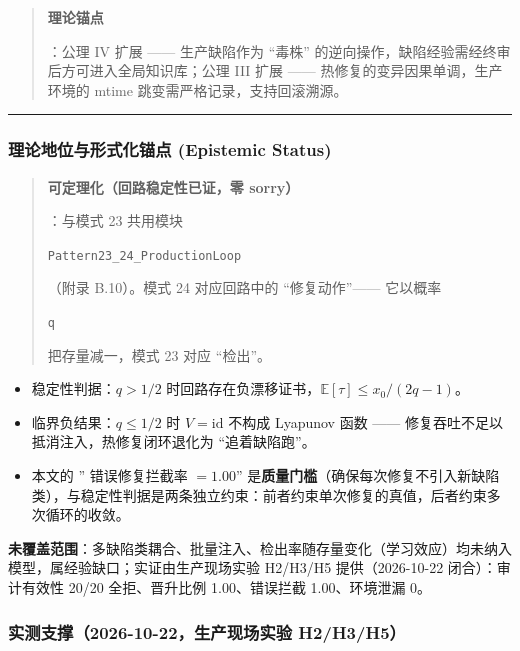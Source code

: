 \begin{quote}
\textbf{理论锚点}

：公理 IV 扩展 ------ 生产缺陷作为 ``毒株''
的逆向操作，缺陷经验需经终审后方可进入全局知识库；公理 III 扩展 ------
热修复的变异因果单调，生产环境的 mtime 跳变需严格记录，支持回滚溯源。
\end{quote}

\begin{center}\rule{0.5\linewidth}{0.5pt}\end{center}

\subsubsection{理论地位与形式化锚点 (Epistemic
Status)}\label{ux7406ux8bbaux5730ux4f4dux4e0eux5f62ux5f0fux5316ux951aux70b9-epistemic-status-2}

\begin{quote}
\textbf{可定理化（回路稳定性已证，零 sorry）}

：与模式 23 共用模块

\texttt{Pattern23\_24\_ProductionLoop}

（附录 B.10）。模式 24 对应回路中的 ``修复动作''------ 它以概率

\texttt{q}

把存量减一，模式 23 对应 ``检出''。
\end{quote}

\begin{itemize}
\item
  稳定性判据：\(q>1/2\)
  时回路存在负漂移证书，\(\mathbb E[\tau]\le x_0/(2q-1)\)。
\item
  临界负结果：\(q\le1/2\) 时 \(V=\mathrm{id}\) 不构成 Lyapunov 函数
  ------ 修复吞吐不足以抵消注入，热修复闭环退化为 ``追着缺陷跑''。
\item
  本文的 '' 错误修复拦截率 \(=1.00\)''
  是\textbf{质量门槛}（确保每次修复不引入新缺陷类），与稳定性判据是两条独立约束：前者约束单次修复的真值，后者约束多次循环的收敛。
\end{itemize}

\textbf{未覆盖范围}：多缺陷类耦合、批量注入、检出率随存量变化（学习效应）均未纳入模型，属经验缺口；实证由生产现场实验
H2/H3/H5 提供（2026-10-22 闭合）：审计有效性 20/20 全拒、晋升比例
1.00、错误拦截 1.00、环境泄漏 0。

\subsubsection{实测支撑（2026-10-22，生产现场实验
H2/H3/H5）}\label{ux5b9eux6d4bux652fux64912026-10-22ux751fux4ea7ux73b0ux573aux5b9eux9a8c-h2h3h5}

